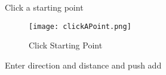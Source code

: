 Click a starting point
\begin{figure}[h!]
\centering
    \texttt{[image: clickAPoint.png]}

\caption{Click Starting Point}
\end{figure}
%
\clearpage




Enter direction and distance and push add




%
%
%  
%  


